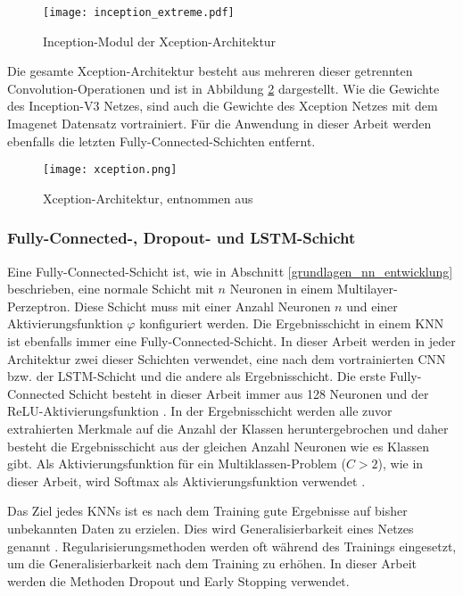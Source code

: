 \begin{figure}[h]
\centering
\texttt{[image: inception\_extreme.pdf]}
\caption{Inception-Modul der Xception-Architektur \cite{chollet2017xception}}
\label{fig_inception_extreme}
\end{figure}

Die gesamte Xception-Architektur besteht aus mehreren dieser getrennten Convolution-Operationen und ist in Abbildung \ref{fig_xception} dargestellt. Wie die Gewichte des Inception-V3 Netzes, sind auch die Gewichte des Xception Netzes mit dem Imagenet Datensatz vortrainiert. Für die Anwendung in dieser Arbeit werden ebenfalls die letzten Fully-Connected-Schichten entfernt.

\begin{figure}[h]
\centering
\texttt{[image: xception.png]}
\caption{Xception-Architektur, entnommen aus \cite{chollet2017xception}}
\label{fig_xception}
\end{figure}

\subsubsection{Fully-Connected-, Dropout- und \ac{LSTM}-Schicht}

Eine Fully-Connected-Schicht ist, wie in Abschnitt \ref{grundlagen_nn_entwicklung} beschrieben, eine normale Schicht mit $n$ Neuronen in einem Multilayer-Perzeptron. Diese Schicht muss mit einer Anzahl  Neuronen $n$ und einer Aktivierungsfunktion $\varphi$ konfiguriert werden. Die Ergebnisschicht in einem \ac{KNN} ist ebenfalls immer eine Fully-Connected-Schicht. In dieser Arbeit werden in jeder Architektur zwei dieser Schichten verwendet, eine nach dem vortrainierten \ac{CNN} bzw. der \ac{LSTM}-Schicht und die andere als Ergebnisschicht. Die erste Fully-Connected Schicht besteht in dieser Arbeit immer aus 128 Neuronen und der \ac{ReLU}-Aktivierungsfunktion \cite{nair2010rectified}. In der Ergebnisschicht werden alle zuvor extrahierten Merkmale auf die Anzahl der Klassen heruntergebrochen und daher besteht die Ergebnisschicht aus der gleichen Anzahl Neuronen wie es Klassen gibt. Als Aktivierungsfunktion für ein Multiklassen-Problem ($C>2$), wie in dieser Arbeit, wird Softmax als Aktivierungsfunktion verwendet \cite{bishop2006pattern}.

Das Ziel jedes \acp{KNN} ist es nach dem Training gute Ergebnisse auf bisher unbekannten Daten zu erzielen. Dies wird Generalisierbarkeit eines Netzes genannt \cite{bishop2006pattern}. Regularisierungsmethoden werden oft während des Trainings eingesetzt, um die Generalisierbarkeit nach dem Training zu erhöhen. In dieser Arbeit werden die Methoden Dropout \cite{hinton2012improving} und Early Stopping \cite{prechelt1998early} verwendet.

